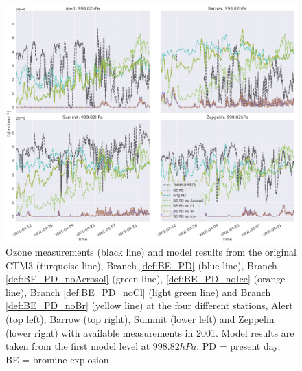 \begin{figure}
    \centering
    \includegraphics[width = \linewidth]{Chapter6_Results/images/ozone_removingHetReacts.png}
    \caption{Ozone measurements (black line) and model results from the original CTM3 (turquoise line), Branch \ref{def:BE_PD} (blue line), Branch \ref{def:BE_PD_noAerosol} (green line), \ref{def:BE_PD_noIce} (orange line), Branch \ref{def:BE_PD_noCl} (light green line) and Branch \ref{def:BE_PD_noBr} (yellow line) at the four different stations, Alert (top left), Barrow (top right), Summit (lower left) and Zeppelin (lower right) with available measurements in 2001. Model results are taken from the first model level at $998.82 hPa$. PD = present day, BE = bromine explosion}
    \label{fig:test_RemoveHetReacts}
\end{figure}